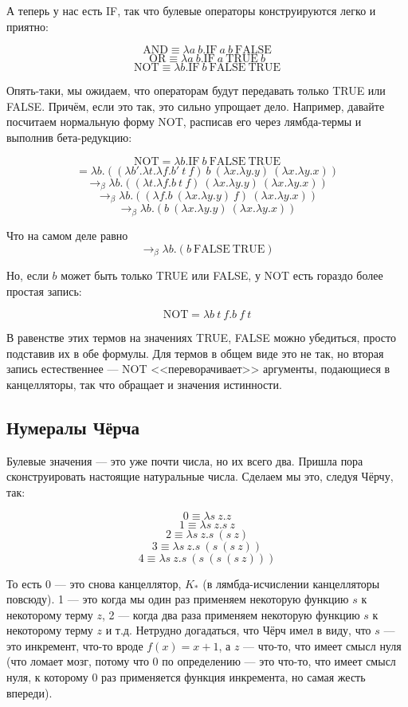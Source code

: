 \documentclass{../../text-style}
\begin{document}
А теперь у нас есть IF, так что булевые операторы конструируются легко и приятно:

$$\mbox{AND} \equiv \lambda a\ b. \mbox{IF}\ a\ b\ \mbox{FALSE}$$
$$\mbox{OR} \equiv \lambda a\ b. \mbox{IF}\ a\ \mbox{TRUE}\ b$$
$$\mbox{NOT} \equiv \lambda b.\mbox{IF}\ b\ \mbox{FALSE}\ \mbox{TRUE}$$

Опять-таки, мы ожидаем, что операторам будут передавать только TRUE или FALSE. Причём, если это так, это сильно упрощает дело. Например, давайте посчитаем нормальную форму NOT, расписав его через лямбда-термы и выполнив бета-редукцию:

$$\mbox{NOT} = \lambda b.\mbox{IF}\ b\ \mbox{FALSE}\ \mbox{TRUE}$$
$$= \lambda b.((\lambda b'.\lambda t.\lambda f.b'\ t\ f)\ b\ (\lambda x.\lambda y.y)\ (\lambda x.\lambda y.x))$$
$$\rightarrow_\beta \lambda b.((\lambda t.\lambda f.b\ t\ f)\ (\lambda x.\lambda y.y)\ (\lambda x.\lambda y.x))$$
$$\rightarrow_\beta \lambda b.((\lambda f.b\ (\lambda x.\lambda y.y)\ f)\ (\lambda x.\lambda y.x))$$
$$\rightarrow_\beta \lambda b.(b\ (\lambda x.\lambda y.y)\ (\lambda x.\lambda y.x))$$

Что на самом деле равно
$$\rightarrow_\beta \lambda b.(b\ \mbox{FALSE}\ \mbox{TRUE})$$

Но, если $b$ может быть только TRUE или FALSE, у NOT есть гораздо более простая запись:

$$\mbox{NOT} = \lambda b\ t\ f.b\ f\ t$$

В равенстве этих термов на значениях TRUE, FALSE можно убедиться, просто подставив их в обе формулы. Для термов в общем виде это не так, но вторая запись естественнее --- NOT <<переворачивает>> аргументы, подающиеся в канцелляторы, так что обращает и значения истинности.

\subsection{Нумералы Чёрча}

Булевые значения --- это уже почти числа, но их всего два. Пришла пора сконструировать настоящие натуральные числа. Сделаем мы это, следуя Чёрчу, так:

$$0 \equiv \lambda s\ z.z$$
$$1 \equiv \lambda s\ z.s\ z$$
$$2 \equiv \lambda s\ z.s\ (s\ z)$$
$$3 \equiv \lambda s\ z.s\ (s\ (s\ z))$$
$$4 \equiv \lambda s\ z.s\ (s\ (s\ (s\ z)))$$

То есть 0 --- это снова канцеллятор, $K_\ast$ (в лямбда-исчислении канцелляторы повсюду). 1 --- это когда мы один раз применяем некоторую функцию $s$ к некоторому терму $z$, 2 --- когда два раза применяем некоторую функцию $s$ к некоторому терму $z$ и т.д. Нетрудно догадаться, что Чёрч имел в виду, что $s$ --- это инкремент, что-то вроде $f(x) = x + 1$, а $z$ --- что-то, что имеет смысл нуля (что ломает мозг, потому что 0 по определению --- это что-то, что имеет смысл нуля, к которому 0 раз применяется функция инкремента, но самая жесть впереди).
\end{document}

